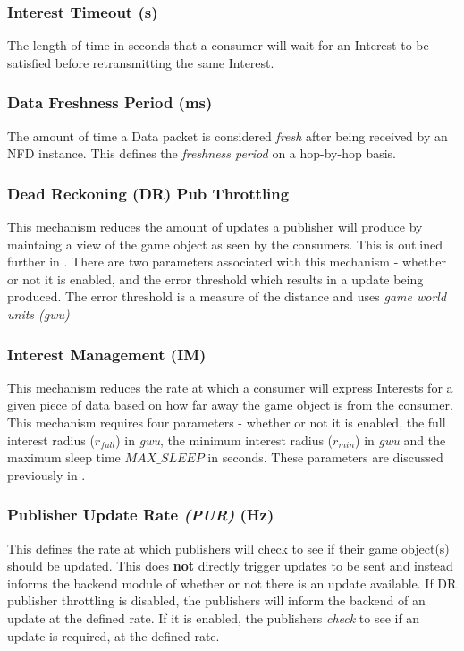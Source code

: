 \subsubsection*{Interest Timeout (s)}
The length of time in seconds that a consumer will wait for an Interest to be satisfied before retransmitting the same Interest.

\subsubsection*{Data Freshness Period (ms)}
The amount of time a Data packet is considered \textit{fresh} after being received by an NFD instance. This defines the \textit{freshness period} on a hop-by-hop basis.

\subsubsection*{Dead Reckoning (DR) Pub Throttling}
This mechanism reduces the amount of updates a publisher will produce by maintaing a view of the game object as seen by the consumers. This is outlined further in . There are two parameters associated with this mechanism - whether or not it is enabled, and the error threshold which results in a update being produced. The error threshold is a measure of the distance and uses \textit{game world units (gwu)} 


\subsubsection*{Interest Management (IM)}
This mechanism reduces the rate at which a consumer will express Interests for a given piece of data based on how far away the game object is from the consumer. This mechanism requires four parameters - whether or not it is enabled, the full interest radius ($r_{full}$) in \textit{gwu}, the minimum interest radius ($r_{min}$) in \textit{gwu} and the maximum sleep time $MAX\_SLEEP$ in seconds. These parameters are discussed previously in . 

\subsubsection*{Publisher Update Rate \textit{(PUR)} (Hz)}
This defines the rate at which publishers will check to see if their game object(s) should be updated. This does \textbf{not} directly trigger updates to be sent and instead informs the backend module of whether or not there is an update available. If DR publisher throttling is disabled, the publishers will inform the backend of an update at the defined rate. If it is enabled, the publishers \textit{check} to see if an update is required, at the defined rate. 

